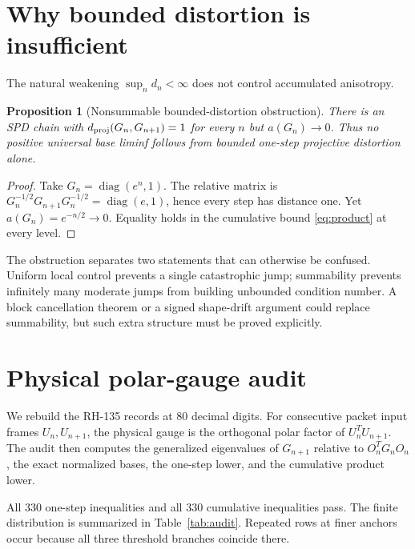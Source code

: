 \documentclass[12pt]{article}
\newtheorem{proposition}[theorem]{Proposition}
\begin{document}
\section{Why bounded distortion is insufficient}
The natural weakening $\sup_n d_n<\infty$ does not control accumulated
anisotropy.

\begin{proposition}[Nonsummable bounded-distortion obstruction]
There is an SPD chain with $d_{\rm proj}(G_n,G_{n+1})=1$ for every $n$ but
$a(G_n)\to0$.  Thus no positive universal base liminf follows from bounded
one-step projective distortion alone.
\end{proposition}
\begin{proof}
Take $G_n=\operatorname{diag}(e^n,1)$.  The relative matrix is
$G_n^{-1/2}G_{n+1}G_n^{-1/2}=\operatorname{diag}(e,1)$, hence every step has
distance one.  Yet $a(G_n)=e^{-n/2}\to0$.  Equality holds in the cumulative
bound \eqref{eq:product} at every level.
\end{proof}

The obstruction separates two statements that can otherwise be confused.
Uniform local control prevents a single catastrophic jump; summability
prevents infinitely many moderate jumps from building unbounded condition
number.  A block cancellation theorem or a signed shape-drift argument could
replace summability, but such extra structure must be proved explicitly.

\section{Physical polar-gauge audit}
We rebuild the RH-135 records at 80 decimal digits.  For consecutive packet
input frames $U_n,U_{n+1}$, the physical gauge is the orthogonal polar factor
of $U_n^TU_{n+1}$.  The audit then computes the generalized eigenvalues of
$G_{n+1}$ relative to $O_n^TG_nO_n$, the exact normalized bases, the
one-step lower, and the cumulative product lower.

All 330 one-step inequalities and all 330 cumulative inequalities pass.  The
finite distribution is summarized in Table~\ref{tab:audit}.  Repeated rows
at finer anchors occur because all three threshold branches coincide there.
\end{document}
